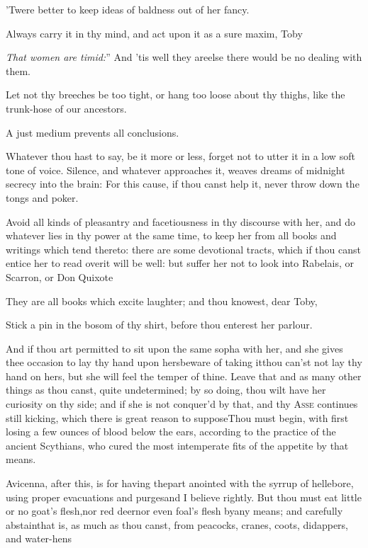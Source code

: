 \documentclass{article}
\begin{document}
\tsh ’Twere better to keep ideas of baldness out of her
fancy.

Always carry it in thy mind, and act upon it as a sure maxim,
Toby\tsh

\lqq\textit{That women are timid:}” And ’tis well they
are\tsh else there would be no dealing with them.

Let not thy breeches be too tight, or hang too loose about thy
thighs, like the trunk-hose of our ancestors.

\tsh A just medium prevents all conclusions.

Whatever thou hast to say, be it more or less, forget not to
utter it in a low soft tone of voice. Silence, and whatever
approaches it, weaves dreams of midnight secrecy into the brain:
For this cause, if thou canst help it, never throw down the
tongs and poker.

Avoid all kinds of pleasantry and facetiousness in thy discourse
with her, and do whatever lies in thy power at the same time, to
keep her from all books and writings which tend thereto: there are
some devotional tracts, which if thou canst entice her to read
over\tsk it will be well: but suffer her not to look into
Rabelais, or Scarron, or Don Quixote\tsh

\tsh They are all books which excite laughter; and thou
knowest, dear Toby, 

Stick a pin in the bosom of thy shirt, before thou enterest her
parlour.

And if thou art permitted to sit upon the same sopha with her,
and she gives thee occasion to lay thy hand upon hers\tsk beware
of taking it\tsh thou can’st not lay thy hand on hers, but she
will feel the temper of thine. Leave that and as many other
things as thou canst, quite undetermined; by so doing, thou wilt
have her curiosity on thy side; and if she is not conquer’d by
that, and thy \textsc{Asse} continues still kicking, which
there is great reason to suppose\tsh Thou must begin, with first
losing a few ounces of blood below the ears, according to the
practice of the ancient Scythians, who cured the most
intemperate fits of the appetite by that means.

Avicenna, after this, is for having the\break part anointed
with the syrrup of helle\-bore, using proper evacuations and
purges\tsh and I believe rightly. But thou must eat little
or no goat’s flesh,\break nor red deer\tsh nor even
foal’s flesh by\break any means; and carefully
abstain\tsh that is, as much as thou canst, from peacocks,
cranes, coots, didappers, and water-hens\tsh
\end{document}
